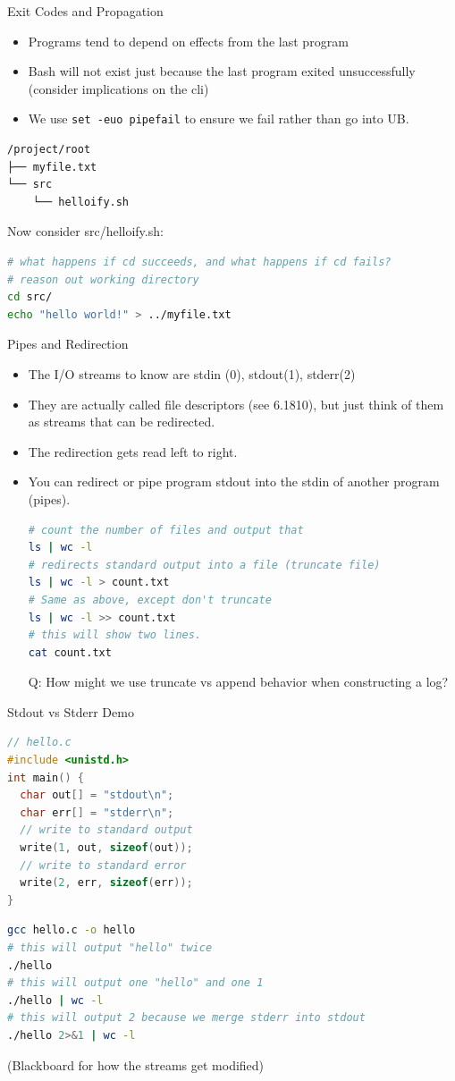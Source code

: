 \documentclass{../lecture}
\begin{document}
\begin{frame}[fragile]{Exit Codes and Propagation}
  \begin{itemize}
    \item Programs tend to depend on effects from the last program
    \item Bash will not exist just because the last program exited
      unsuccessfully (consider implications on the cli)
    \item We use \texttt{set -euo pipefail} to ensure we fail rather than go
      into UB.
  \end{itemize}
\begin{verbatim}
/project/root
├── myfile.txt
└── src
    └── helloify.sh
\end{verbatim}
Now consider src/helloify.sh:
\begin{lstlisting}[language=bash]
# what happens if cd succeeds, and what happens if cd fails?
# reason out working directory
cd src/
echo "hello world!" > ../myfile.txt
\end{lstlisting}
\end{frame}

\begin{frame}[fragile]{Pipes and Redirection}
  \begin{itemize}
    \item The I/O streams to know are stdin (0), stdout(1), stderr(2)
    \item They are actually called file descriptors (see 6.1810), but just think
      of them as streams that can be redirected.
    \item The redirection gets read left to right.
    \item You can redirect or pipe program stdout into the stdin of another
      program (pipes).
\begin{lstlisting}[language=bash]
# count the number of files and output that
ls | wc -l
# redirects standard output into a file (truncate file)
ls | wc -l > count.txt
# Same as above, except don't truncate
ls | wc -l >> count.txt
# this will show two lines.
cat count.txt
\end{lstlisting}
Q: How might we use truncate vs append behavior when constructing a log?
  \end{itemize}
\end{frame}

\begin{frame}[fragile]{Stdout vs Stderr Demo}
\begin{lstlisting}[language=c]
// hello.c
#include <unistd.h>
int main() {
  char out[] = "stdout\n";
  char err[] = "stderr\n";
  // write to standard output
  write(1, out, sizeof(out));
  // write to standard error
  write(2, err, sizeof(err));
}
\end{lstlisting}
\begin{lstlisting}[language=bash]
gcc hello.c -o hello
# this will output "hello" twice
./hello
# this will output one "hello" and one 1
./hello | wc -l
# this will output 2 because we merge stderr into stdout
./hello 2>&1 | wc -l
\end{lstlisting}
(Blackboard for how the streams get modified)
\end{frame}
\end{document}
